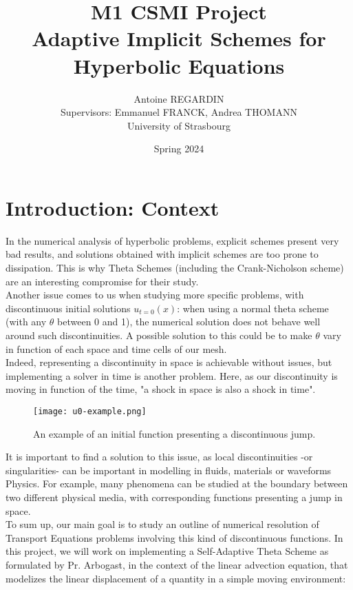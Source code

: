 \documentclass[12pt]{article}
\begin{document}
\def\spacingset#1{\renewcommand{\baselinestretch}%
{#1}\small\normalsize} \spacingset{1}

\title{\bf M1 CSMI Project\\ Adaptive Implicit Schemes for Hyperbolic Equations}
\author{Antoine REGARDIN\hspace{.2cm}\\
    Supervisors: Emmanuel FRANCK, Andrea THOMANN\\
    University of Strasbourg\\ }
\date{Spring 2024}
\maketitle

\section{Introduction: Context}
In the numerical analysis of hyperbolic problems, explicit schemes present very bad results, and solutions obtained with implicit schemes
are too prone to dissipation. This is why Theta Schemes (including the Crank-Nicholson scheme) are an interesting compromise for their study.\\
Another issue comes to us when studying more specific problems, with discontinuous initial solutions $u_{t=0}(x)$: when using a normal theta scheme (with any $\theta$ between 0 and 1),
the numerical solution does not behave well around such discontinuities. A possible solution to this could be to make $\theta$ vary in function of each space and time cells of our mesh.\\
Indeed, representing a discontinuity in space is achievable without issues, but implementing a solver in time is another problem.
Here, as our discontinuity is moving in function of the time, "a shock in space is also a shock in time".\\
\vspace{10pt}
\begin{figure}[H]
    \centering
    \texttt{[image: u0-example.png]}
    \caption{An example of an initial function presenting a discontinuous jump.}
\end{figure}

It is important to find a solution to this issue, as local discontinuities -or singularities- can be important in modelling in fluids, materials or waveforms Physics.
For example, many phenomena can be studied at the boundary between two different physical media,
with corresponding functions presenting a jump in space.\\
To sum up, our main goal is to study an outline of numerical resolution of Transport Equations problems
involving this kind of discontinuous functions. In this project, we will work on implementing a Self-Adaptive Theta Scheme as formulated by Pr. Arbogast, 
in the context of the linear advection equation, that modelizes the linear displacement of a quantity in a simple moving environment:
\end{document}
